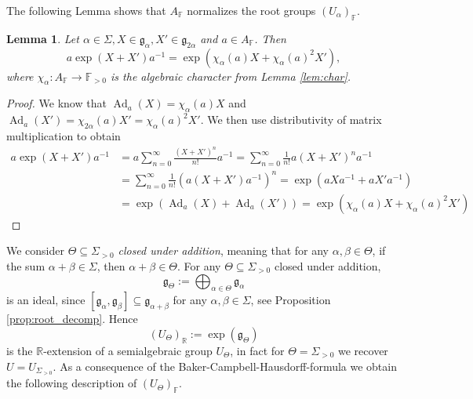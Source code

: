 \documentclass[12pt]{amsart}
\newcommand{\F}{\mathbb{F} }
\newcommand{\R}{\mathbb{R} }
\newcommand{\frakg}{\mathfrak{g}}
\numberwithin{equation}{section}
\newtheorem{lemma}[theorem]{Lemma}
\theoremstyle{remark} %
\begin{document}
The following Lemma shows that $A_\F$ normalizes the root groups $(U_\alpha)_\F$.

\begin{lemma} \label{lem:aexpXa}
	Let $\alpha \in \Sigma, X\in \mathfrak{g}_\alpha, X' \in \mathfrak{g}_{2\alpha}$ and $a \in A_\F $. Then 
	$$a\exp\left(X + X'\right)a^{-1} = \exp\left(\chi_\alpha (a) X + \chi_\alpha(a)^2 X'\right),$$
	where $\chi_\alpha \colon A_\F \to \mathbb{F}_{>0}$ is the algebraic character from Lemma \ref{lem:char}.
\end{lemma}
\begin{proof}
	We know	that $\operatorname{Ad}_a(X) = \chi_\alpha(a) X$ and $\operatorname{Ad}_a(X') = \chi_{2\alpha}(a) X' = \chi_\alpha(a)^2 X'$.
	We then use distributivity of matrix multiplication to obtain
	\begin{align*}
		a\exp(X+X')a^{-1} &= a\sum_{n=0}^\infty \frac{(X+X')^n}{n!}a^{-1} 
		=\sum_{n=0}^\infty \frac{1}{n!} a(X+X')^n a^{-1} \\
		& =\sum_{n=0}^\infty \frac{1}{n!} \left(a(X+X')a^{-1}\right)^n 
		= \exp \left(aXa^{-1} + aX'a^{-1}\right) \\
		&= \exp \left(\operatorname{Ad}_a(X) + \operatorname{Ad}_a(X')\right)
		= \exp \left(\chi_\alpha(a)X + \chi_\alpha(a)^2 X'\right)
	\end{align*}
\end{proof}
We consider $\Theta \subseteq \Sigma_{>0}$ \emph{closed under addition}, meaning that for any $\alpha, \beta \in \Theta$, if the sum $\alpha + \beta \in \Sigma$, then $\alpha + \beta \in \Theta$. For any $\Theta \subseteq \Sigma_{>0}$ closed under addition,
$$
\frakg_\Theta := \bigoplus_{\alpha \in \Theta} \frakg_\alpha 
$$
is an ideal, since $\left[ \frakg_\alpha , \frakg_\beta \right] \subseteq \frakg_{\alpha + \beta}$ for any $\alpha, \beta \in \Sigma$, see Proposition \ref{prop:root_decomp}. Hence 
$$
(U_\Theta)_\R :=\exp(\frakg_\Theta)
$$
is the $\R$-extension of a semialgebraic group $U_{\Theta}$, in fact for $\Theta = \Sigma_{>0}$ we recover $U = U_{\Sigma_{>0}}$. As a consequence of the Baker-Campbell-Hausdorff-formula we obtain the following description of $(U_\Theta)_\F$.
\end{document}
